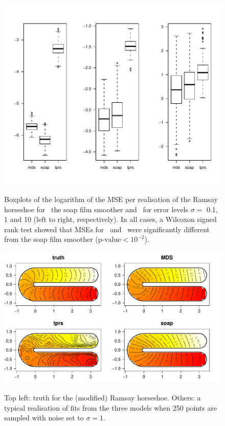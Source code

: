 {%
\begin{figure}
\centering
\includegraphics[width=6in, trim=0in 0.5in 0in 0in]{mds/figs/mds-ramsay-boxplot.pdf} \\
\caption{Boxplots of the logarithm of the MSE per realisation of the Ramsay horseshoe for \mdsap\, the soap film smoother and \tprs\ for error levels $\sigma=$ 0.1, 1 and 10 (left to right, respectively). In all cases, a Wilcoxon signed rank test showed that MSEs for \mdsap\ and \tprs\ were significantly different from the soap film smoother ($\text{p-value} < 10^{-2}$).}
\label{mds-ramsay-boxplot}
\end{figure}

\begin{figure}
\centering
\includegraphics[width=6in]{mds/figs/ramsay-fit-1.pdf} \\
\caption{Top left: truth for the (modified) Ramsay horseshoe. Others: a typical realisation of fits from the three models when 250 points are sampled with noise set to $\sigma=1$.}
\label{mds-ramsay-fit-1}
\end{figure}

}
